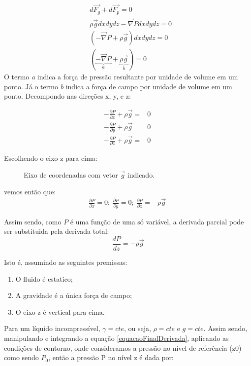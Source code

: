 \documentclass{article}
\begin{document}
\begin{align*}
&d\vec{F_g} + d\vec{F_p}=0\\
&\rho \vec{g}dxdydz - \vec{\nabla}Pdxdydz=0\\
&(-\vec{\nabla}P + \rho\vec{g}) dxdydz=0\\
&(\underbrace{-\vec{\nabla}P}_a + \underbrace{\rho\vec{g}}_b)=0\
\end{align*}
O termo \textit{a} indica a força de pressão resultante por unidade de volume em um ponto. Já o termo \textit{b} indica a força de campo por unidade de volume em um ponto.
\newpage
Decompondo nas direções x, y, e z:

\begin{align}
-\frac{\partial P}{\partial x} + \rho \vec{g}=&0\\
-\frac{\partial P}{\partial y} + \rho \vec{g}=&0\\
-\frac{\partial P}{\partial z} + \rho \vec{g}=&0\
\end{align}

Escolhendo o eixo z para cima:
\begin{figure}[!h]
     \centering
     \def\svgwidth{0.25\textwidth}
     
     \caption{\label{fig:gravidadeCoordenadas} Eixo de coordenadas com vetor $\vec{g}$ indicado.}
     \hfill
\end{figure}

vemos então que:
\begin{align*}
\frac{\partial P}{\partial x}=0 ;\ 
\frac{\partial P}{\partial y}=0 ;\
\frac{\partial P}{\partial z} = -\rho \vec{g}\
\end{align*}

Assim sendo, como $P$ é uma função de uma só variável, a derivada parcial pode ser substituida pela derivada total:
\begin{equation}
     \frac{dP}{dz}=-\rho \vec{g}
     \label{equacaoFinalDerivada}
\end{equation}

Isto é, assumindo as seguintes premissas:
\begin{enumerate}
     \item O fluido é estatico;
     \item A gravidade é a única força de campo;
     \item O eixo z é vertical para cima.
\end{enumerate}

 
Para um líquido incompressível, $\gamma = cte$, ou seja, $\rho = cte$ e $g = cte$. Assim sendo, manipulando e integrando a equação \ref{equacaoFinalDerivada}, aplicando as condições de contorno, onde consideramos a pressão no nível de referência (z0) como sendo $P_0$, então a pressão P no nível z é dada por:
\end{document}

